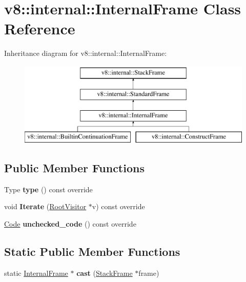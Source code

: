 \hypertarget{classv8_1_1internal_1_1InternalFrame}{}\section{v8\+:\+:internal\+:\+:Internal\+Frame Class Reference}
\label{classv8_1_1internal_1_1InternalFrame}
Inheritance diagram for v8\+:\+:internal\+:\+:Internal\+Frame\+:\begin{figure}[H]
\begin{center}
\leavevmode
\includegraphics[height=4.000000cm]{classv8_1_1internal_1_1InternalFrame}
\end{center}
\end{figure}
\subsection*{Public Member Functions}
\begin{DoxyCompactItemize}
\item 
\mbox{\label{classv8_1_1internal_1_1InternalFrame_a5efc0b41022670e79be85743d3d0a572}} 
Type {\bfseries type} () const override
\item 
\mbox{\label{classv8_1_1internal_1_1InternalFrame_aa7d3c8223747bcd3981858dd4a76ba02}} 
void {\bfseries Iterate} (\mbox{\hyperlink{classv8_1_1internal_1_1RootVisitor}{Root\+Visitor}} $\ast$v) const override
\item 
\mbox{\label{classv8_1_1internal_1_1InternalFrame_a7a4137c3792842026888f6e7c427bf80}} 
\mbox{\hyperlink{classv8_1_1internal_1_1Code}{Code}} {\bfseries unchecked\+\_\+code} () const override
\end{DoxyCompactItemize}
\subsection*{Static Public Member Functions}
\begin{DoxyCompactItemize}
\item 
\mbox{\label{classv8_1_1internal_1_1InternalFrame_a2e3c28f5bfdf3f5387a5f774d0398271}} 
static \mbox{\hyperlink{classv8_1_1internal_1_1InternalFrame}{Internal\+Frame}} $\ast$ {\bfseries cast} (\mbox{\hyperlink{classv8_1_1internal_1_1StackFrame}{Stack\+Frame}} $\ast$frame)
\end{DoxyCompactItemize}
